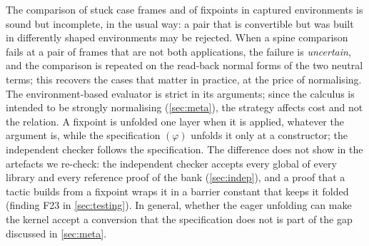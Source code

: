 The comparison of stuck case frames and of fixpoints in captured environments is sound but incomplete, in the usual way: a pair that is convertible but was built in differently shaped environments may be rejected.
When a spine comparison fails at a pair of frames that are not both applications, the failure is \emph{uncertain}, and the comparison is repeated on the read-back normal forms of the two neutral terms; this recovers the cases that matter in practice, at the price of normalising.
The environment-based evaluator is strict in its arguments; since the calculus is intended to be strongly normalising (\cref{sec:meta}), the strategy affects cost and not the relation.
A fixpoint is unfolded one layer when it is applied, whatever the argument is, while the specification $(\varphi)$ unfolds it only at a constructor; the independent checker follows the specification.
The difference does not show in the artefacts we re-check: the independent checker accepts every global of every library and every reference proof of the bank (\cref{sec:indep}), and a proof that a tactic builds from a fixpoint wraps it in a barrier constant that keeps it folded (finding F23 in \cref{sec:testing}).
In general, whether the eager unfolding can make the kernel accept a conversion that the specification does not is part of the gap discussed in \cref{sec:meta}.
